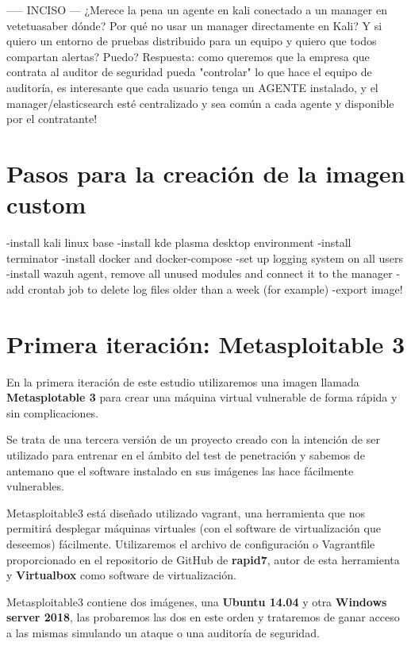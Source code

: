 ----- INCISO --- ¿Merece la pena un agente en kali conectado a un manager en vetetuasaber dónde? 
Por qué no usar un manager directamente en Kali? 
Y si quiero un entorno de pruebas distribuido para un equipo y quiero que todos compartan alertas? Puedo? 
Respuesta: como queremos que la empresa que contrata al auditor de seguridad pueda "controlar" lo que hace el equipo de auditoría, es interesante que cada usuario tenga un AGENTE instalado, y el manager/elasticsearch esté centralizado y sea común a cada agente y disponible por el contratante!

\section{Pasos para la creación de la imagen custom}
-install kali linux base
-install kde plasma desktop environment
-install terminator
-install docker and docker-compose
-set up logging system on all users
-install wazuh agent, remove all unused modules and connect it to the manager
-add crontab job to delete log files older than a week (for example)
-export image! 






\section{Primera iteración: Metasploitable 3}

En la primera iteración de este estudio utilizaremos una imagen llamada \textbf{Metasplotable 3} \cite{metasploitable3} para crear una máquina virtual vulnerable de forma rápida y sin complicaciones.

Se trata de una tercera versión de un proyecto creado con la intención de ser utilizado para entrenar en el ámbito del test de penetración y sabemos de antemano que el software instalado en sus imágenes las hace fácilmente vulnerables.

Metasploitable3 está diseñado utilizado \gls{vagrant}, una herramienta que nos permitirá desplegar máquinas virtuales (con el software de virtualización que deseemos) fácilmente.  Utilizaremos el archivo de configuración o Vagrantfile proporcionado en el repositorio de GitHub de \textbf{rapid7}, autor de esta herramienta y \textbf{Virtualbox} como software de virtualización.

Metasploitable3 contiene dos imágenes, una \textbf{Ubuntu 14.04} y otra \textbf{Windows server 2018}, las probaremos las dos en este orden y trataremos de ganar acceso a las mismas simulando un ataque o una auditoría de seguridad.








